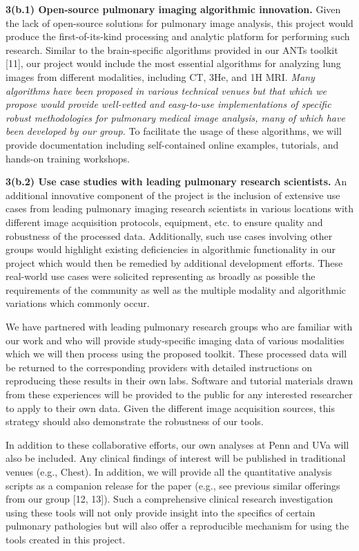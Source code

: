 \documentclass[11pt,]{article}
\begin{document}
\textbf{3(b.1) Open-source pulmonary imaging algorithmic innovation.}
Given the lack of open-source solutions for pulmonary image analysis,
this project would produce the first-of-its-kind processing and analytic
platform for performing such research. Similar to the brain-specific
algorithms provided in our ANTs toolkit {[}11{]}, our project would
include the most essential algorithms for analyzing lung images from
different modalities, including CT, 3He, and 1H MRI. \emph{Many
algorithms have been proposed in various technical venues but that which
we propose would provide well-vetted and easy-to-use implementations of
specific robust methodologies for pulmonary medical image analysis, many
of which have been developed by our group.} To facilitate the usage of
these algorithms, we will provide documentation including self-contained
online examples, tutorials, and hands-on training workshops.

\textbf{3(b.2) Use case studies with leading pulmonary research
scientists.} An additional innovative component of the project is the
inclusion of extensive use cases from leading pulmonary imaging research
scientists in various locations with different image acquisition
protocols, equipment, etc. to ensure quality and robustness of the
processed data. Additionally, such use cases involving other groups
would highlight existing deficiencies in algorithmic functionality in
our project which would then be remedied by additional development
efforts. These real-world use cases were solicited representing as
broadly as possible the requirements of the community as well as the
multiple modality and algorithmic variations which commonly occur.

We have partnered with leading pulmonary research groups who are
familiar with our work and who will provide study-specific imaging data
of various modalities which we will then process using the proposed
toolkit. These processed data will be returned to the corresponding
providers with detailed instructions on reproducing these results in
their own labs. Software and tutorial materials drawn from these
experiences will be provided to the public for any interested researcher
to apply to their own data. Given the different image acquisition
sources, this strategy should also demonstrate the robustness of our
tools.

In addition to these collaborative efforts, our own analyses at Penn and
UVa will also be included. Any clinical findings of interest will be
published in traditional venues (e.g., Chest). In addition, we will
provide all the quantitative analysis scripts as a companion release for
the paper (e.g., see previous similar offerings from our group {[}12,
13{]}). Such a comprehensive clinical research investigation using these
tools will not only provide insight into the specifics of certain
pulmonary pathologies but will also offer a reproducible mechanism for
using the tools created in this project.
\end{document}
